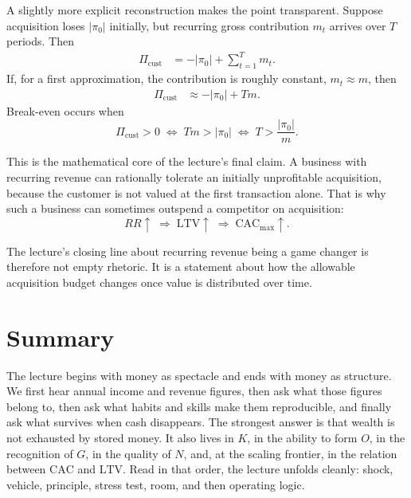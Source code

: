 A slightly more explicit reconstruction makes the point transparent. Suppose acquisition loses \(|\pi_0|\) initially, but recurring gross contribution \(m_t\) arrives over \(T\) periods. Then
\begin{align}
\Pi_{\mathrm{cust}}
&= -|\pi_0| + \sum_{t=1}^{T} m_t.
\end{align}
If, for a first approximation, the contribution is roughly constant, \(m_t \approx m\), then
\begin{align}
\Pi_{\mathrm{cust}}
&\approx -|\pi_0| + Tm.
\end{align}
Break-even occurs when
\begin{equation}
\Pi_{\mathrm{cust}} > 0
\;\Longleftrightarrow\;
Tm > |\pi_0|
\;\Longleftrightarrow\;
T > \frac{|\pi_0|}{m}.
\end{equation}

This is the mathematical core of the lecture's final claim. A business with recurring revenue can rationally tolerate an initially unprofitable acquisition, because the customer is not valued at the first transaction alone. That is why such a business can sometimes outspend a competitor on acquisition:
\begin{equation}
RR \uparrow
\;\Longrightarrow\;
\mathrm{LTV} \uparrow
\;\Longrightarrow\;
\mathrm{CAC}_{\max} \uparrow.
\end{equation}

The lecture's closing line about recurring revenue being a game changer is therefore not empty rhetoric. It is a statement about how the allowable acquisition budget changes once value is distributed over time.

\section{Summary}

The lecture begins with money as spectacle and ends with money as structure. We first hear annual income and revenue figures, then ask what those figures belong to, then ask what habits and skills make them reproducible, and finally ask what survives when cash disappears. The strongest answer is that wealth is not exhausted by stored money. It also lives in \(K\), in the ability to form \(O\), in the recognition of \(G\), in the quality of \(N\), and, at the scaling frontier, in the relation between \(\mathrm{CAC}\) and \(\mathrm{LTV}\). Read in that order, the lecture unfolds cleanly: shock, vehicle, principle, stress test, room, and then operating logic.